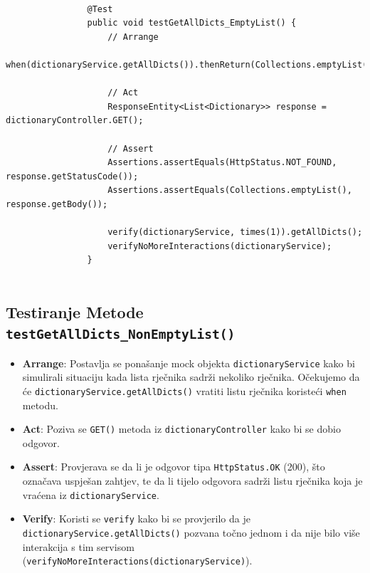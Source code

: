 			\begin{lstlisting}
				
				@Test
				public void testGetAllDicts_EmptyList() {
					// Arrange
					when(dictionaryService.getAllDicts()).thenReturn(Collections.emptyList());
					
					// Act
					ResponseEntity<List<Dictionary>> response = dictionaryController.GET();
					
					// Assert
					Assertions.assertEquals(HttpStatus.NOT_FOUND, response.getStatusCode());
					Assertions.assertEquals(Collections.emptyList(), response.getBody());
					
					verify(dictionaryService, times(1)).getAllDicts();
					verifyNoMoreInteractions(dictionaryService);
				}
				
			\end{lstlisting}
			
			\subsection{Testiranje Metode \texttt{testGetAllDicts_NonEmptyList()}}	
			
			\begin{itemize}
				\item \textbf{Arrange}: Postavlja se ponašanje mock objekta \texttt{dictionaryService} kako bi simulirali situaciju kada lista rječnika sadrži nekoliko rječnika. Očekujemo da će \texttt{dictionaryService.getAllDicts()} vratiti listu rječnika koristeći \texttt{when} metodu.
				
				\item \textbf{Act}: Poziva se \texttt{GET()} metoda iz \texttt{dictionaryController} kako bi se dobio odgovor.
				
				\item \textbf{Assert}: Provjerava se da li je odgovor tipa \texttt{HttpStatus.OK} (200), što označava uspješan zahtjev, te da li tijelo odgovora sadrži listu rječnika koja je vraćena iz \texttt{dictionaryService}.
				
				\item \textbf{Verify}: Koristi se \texttt{verify} kako bi se provjerilo da je \texttt{dictionaryService.getAllDicts()} pozvana točno jednom i da nije bilo više interakcija s tim servisom (\texttt{verifyNoMoreInteractions(dictionaryService)}).
			\end{itemize}
			
